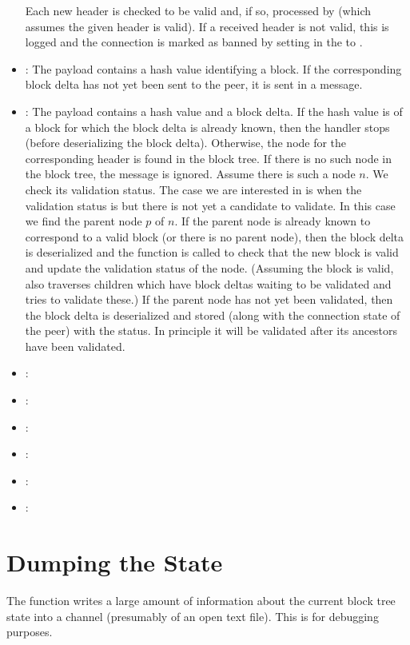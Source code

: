 \begin{itemize}
Each new header is checked to be valid and, if so, processed by {} (which assumes the given header is valid).
If a received header is not valid, this is logged and the connection is marked as banned by setting {} in the {} to {}.
\item {}: The payload contains a hash value identifying a block.
If the corresponding block delta has not yet been sent to the peer, it is sent in a {} message.
\item {}: The payload contains a hash value and a block delta.
If the hash value is of a block for which the block delta is already known, then
the handler stops (before deserializing the block delta).
Otherwise, the node for the corresponding header is found in the block tree.
If there is no such node in the block tree, the message is ignored.
Assume there is such a node $n$.
We check its validation status.
The case we are interested in is when the validation status is {}
but there is not yet a candidate {} to validate.
In this case we find the parent node $p$ of $n$.
If the parent node is already known to correspond to a valid block (or there is no parent node),
then the block delta is deserialized
and the function {} is called to check
that the new block is valid and update the validation status of the node.
(Assuming the block is valid, {} also traverses children
which have block deltas waiting to be validated and tries to validate these.)
If the parent node has not yet been validated,
then the block delta is deserialized and stored (along with the connection state of the peer)
with the {} status. In principle it will be validated after its ancestors
have been validated.
\item {}: 
\item {}: 
\item {}: 
\item {}: 
\item {}: 
\item {}: 
\end{itemize}

\section{Dumping the State}

The function {} writes a large amount of information about
the current block tree state into a channel (presumably of an open text file).
This is for debugging purposes.
